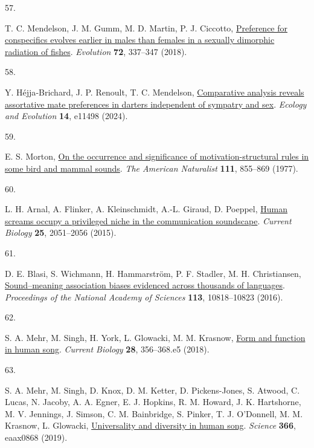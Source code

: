 \documentclass[
]{article}
\newlength{\cslhangindent}
\newlength{\csllabelwidth}
\newenvironment{CSLReferences}[2] %
 {\begin{list}{}{%
  \setlength{\itemindent}{0pt}
  \setlength{\leftmargin}{0pt}
  \setlength{\parsep}{0pt}
  \ifodd #1
   \setlength{\leftmargin}{\cslhangindent}
   \setlength{\itemindent}{-1\cslhangindent}
  \fi
  \setlength{\itemsep}{#2\baselineskip}}}
 {\end{list}}
\newcommand{\CSLLeftMargin}[1]{\parbox[t]{\csllabelwidth}{\strut#1\strut}}
\newcommand{\CSLRightInline}[1]{\parbox[t]{\linewidth - \csllabelwidth}{\strut#1\strut}}
\begin{document}
\begin{CSLReferences}{0}{0}
\CSLLeftMargin{57. }%
\CSLRightInline{T. C. Mendelson, J. M. Gumm, M. D. Martin, P. J.
Ciccotto, \href{https://doi.org/10.1111/evo.13406}{Preference for
conspecifics evolves earlier in males than females in a sexually
dimorphic radiation of fishes}. \emph{Evolution} \textbf{72}, 337--347
(2018).}

\CSLLeftMargin{58. }%
\CSLRightInline{Y. Héjja‐Brichard, J. P. Renoult, T. C. Mendelson,
\href{https://doi.org/10.1002/ece3.11498}{Comparative analysis reveals
assortative mate preferences in darters independent of sympatry and
sex}. \emph{Ecology and Evolution} \textbf{14}, e11498 (2024).}

\CSLLeftMargin{59. }%
\CSLRightInline{E. S. Morton, \href{https://doi.org/10.1086/283219}{On
the occurrence and significance of motivation-structural rules in some
bird and mammal sounds}. \emph{The American Naturalist} \textbf{111},
855--869 (1977).}

\CSLLeftMargin{60. }%
\CSLRightInline{L. H. Arnal, A. Flinker, A. Kleinschmidt, A.-L. Giraud,
D. Poeppel, \href{https://doi.org/10.1016/j.cub.2015.06.043}{Human
screams occupy a privileged niche in the communication soundscape}.
\emph{Current Biology} \textbf{25}, 2051--2056 (2015).}

\CSLLeftMargin{61. }%
\CSLRightInline{D. E. Blasi, S. Wichmann, H. Hammarström, P. F. Stadler,
M. H. Christiansen,
\href{https://doi.org/10.1073/pnas.1605782113}{Sound--meaning
association biases evidenced across thousands of languages}.
\emph{Proceedings of the National Academy of Sciences} \textbf{113},
10818--10823 (2016).}

\CSLLeftMargin{62. }%
\CSLRightInline{S. A. Mehr, M. Singh, H. York, L. Glowacki, M. M.
Krasnow, \href{https://doi.org/10.1016/j.cub.2017.12.042}{Form and
function in human song}. \emph{Current Biology} \textbf{28}, 356--368.e5
(2018).}

\CSLLeftMargin{63. }%
\CSLRightInline{S. A. Mehr, M. Singh, D. Knox, D. M. Ketter, D.
Pickens-Jones, S. Atwood, C. Lucas, N. Jacoby, A. A. Egner, E. J.
Hopkins, R. M. Howard, J. K. Hartshorne, M. V. Jennings, J. Simson, C.
M. Bainbridge, S. Pinker, T. J. O'Donnell, M. M. Krasnow, L. Glowacki,
\href{https://doi.org/10.1126/science.aax0868}{Universality and
diversity in human song}. \emph{Science} \textbf{366}, eaax0868 (2019).}


\end{CSLReferences}
\end{document}
